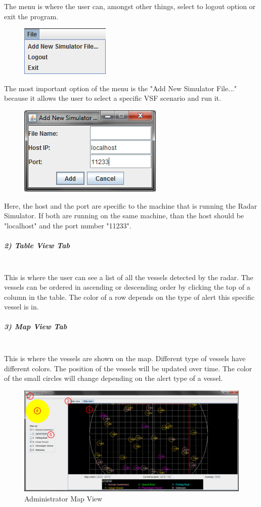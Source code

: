\documentclass{article}
\begin{document}
The menu is where the user can, amongst other things, select to logout option or exit the program.
	\begin{figure}[!htb]
	\centering
	\includegraphics[scale=0.70]{images/userManual4.jpg}
	\end{figure}

The most important option of the menu is the "Add New Simulator File..."  because it allows the user to select a specific VSF scenario and run it.

	\begin{figure}[!htb]
	\centering
	\includegraphics[scale=0.70]{images/userManual5.jpg}
	\end{figure}

Here, the host and the port are specific to the machine that is running the Radar Simulator. If both are running on the same machine, than the host should be "localhost" and the port number "11233".

\subparagraph{2) Table View Tab \\ \\}
This is where the user can see a list of all the vessels detected by the radar. The vessels can be ordered in ascending or descending order by clicking the top of a column in the table. The color of a row depends on the type of alert this specific vessel is in.

\subparagraph{3) Map View Tab \\ \\}
This is where the vessels are shown on the map. Different type of vessels have different colors. The position of the vessels will be updated over time. The color of the small circles will change depending on the alert type of a vessel.
	
	\begin{figure}[!htb]
	\caption{Administrator Map View}
	\centering
	\includegraphics[scale=0.36]{images/userManual3_admin.jpg}
	\end{figure}
\end{document}
